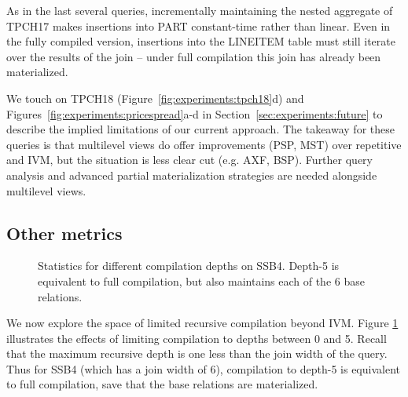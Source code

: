 
As in the last several queries, incrementally maintaining the nested aggregate of TPCH17 makes insertions into PART constant-time rather than linear.  Even in the fully compiled version, insertions into the LINEITEM table must still iterate over the results of the join -- under full compilation this join has already been materialized.

We touch on TPCH18 (Figure~\ref{fig:experiments:tpch18}d) and Figures~\ref{fig:experiments:pricespread}a-d in Section~\ref{sec:experiments:future} to describe the implied limitations of our current approach. The takeaway for these queries is that multilevel views do offer improvements (PSP, MST) over repetitive and IVM, but the situation is less clear cut (e.g. AXF, BSP). Further query analysis and advanced partial materialization strategies are needed alongside multilevel views.


\subsection{Other metrics}
\label{sec:experiments:othermetrics}

\begin{figure}
\begin{center}
\resizebox{3.4in}{!}{

}
\caption{Statistics for different compilation depths on SSB4.  Depth-5 is equivalent to full compilation, but also maintains each of the 6 base relations.}
\label{fig:experiments:ssb4depth}
\end{center}
\vspace*{-0.2in}
\end{figure}
We now explore the space of limited recursive compilation beyond IVM.  Figure \ref{fig:experiments:ssb4depth} illustrates the effects of limiting compilation to depths between 0 and 5.  Recall that the maximum recursive depth is one less than the join width of the query.  Thus for SSB4 (which has a join width of 6), compilation to depth-5 is equivalent to full compilation, save that the base relations are materialized.

